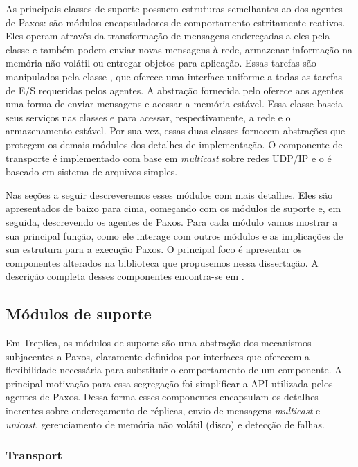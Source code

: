 As principais classes de suporte possuem estruturas semelhantes ao dos agentes de Paxos:
são módulos encapsuladores de comportamento estritamente reativos. Eles operam através
da transformação de mensagens endereçadas a eles pela classe  e também
podem enviar novas mensagens à rede, armazenar informação na memória não-volátil ou
entregar objetos para aplicação. Essas tarefas são manipulados pela classe
, que oferece uma interface uniforme a todas as tarefas de E/S
requeridas pelos agentes. A abstração fornecida pelo  oferece aos
agentes uma forma de enviar mensagens e acessar a memória estável. Essa classe baseia seus
serviços nas classes  e  para acessar,
respectivamente, a rede e o armazenamento estável. Por sua vez, essas duas classes
fornecem abstrações que protegem os demais módulos dos detalhes de implementação. O
componente de transporte é implementado com base em \emph{multicast} sobre redes UDP/IP e
o  é baseado em sistema de arquivos simples.

Nas seções a seguir descreveremos esses módulos com mais detalhes. Eles são apresentados
de baixo para cima, começando com os módulos de suporte e, em seguida, descrevendo os
agentes de Paxos. Para cada módulo vamos mostrar a sua principal função, como ele interage
com outros módulos e as implicações de sua estrutura para a execução Paxos. O principal
foco é apresentar os componentes alterados na biblioteca que propusemos nessa dissertação.
A descrição completa desses componentes encontra-se em .

\subsection{Módulos de suporte}

Em Treplica, os módulos de suporte são uma abstração dos mecanismos subjacentes a Paxos,
claramente definidos por interfaces que oferecem a flexibilidade necessária para
substituir o comportamento de um componente. A principal motivação para essa segregação
foi simplificar a API utilizada pelos agentes de Paxos. Dessa forma esses componentes
encapsulam os detalhes inerentes sobre endereçamento de réplicas, envio de mensagens
\emph{multicast} e \emph{unicast}, gerenciamento de memória não volátil (disco) e detecção
de falhas.

\subsubsection{Transport}\label{subsec:transport}

